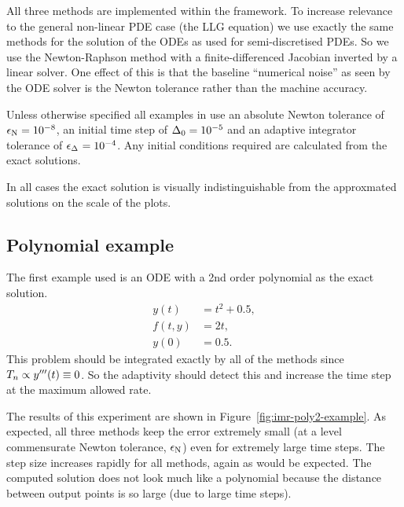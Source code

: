 All three methods are implemented within the \oomph framework.
To increase relevance to the general non-linear PDE case (\ie the LLG equation) we use exactly the same methods for the solution of the ODEs as used for semi-discretised PDEs.
So we use the Newton-Raphson method with a finite-differenced Jacobian inverted by a linear solver.
One effect of this is that the baseline ``numerical noise'' as seen by the ODE solver is the Newton tolerance rather than the machine accuracy.

Unless otherwise specified all examples in  use an absolute Newton tolerance of $\epsilon_{\mathrm{N}} = 10^{-8}$, an initial time step of $\Delta_{0} = 10^{-5}$ and an adaptive integrator tolerance of $\epsilon_{\Delta_{}} = 10^{-4}$.
Any initial conditions required are calculated from the exact solutions.

In all cases the exact solution is visually indistinguishable from the approxmated solutions on the scale of the plots.


\subsection{Polynomial example}
\label{sec:imr-polynomial-example}

The first example used is an ODE with a 2nd order polynomial as the exact solution.
\begin{equation}
  \label{eqn:imr-test-poly2}
  \begin{aligned}
    y(t) &= t^2 + 0.5, \\
    f(t,y) &= 2t, \\
    y(0) & = 0.5.
  \end{aligned}
\end{equation}
This problem should be integrated exactly by all of the methods since $T_n \propto y'''(t) \equiv 0$.
So the adaptivity should detect this and increase the time step at the maximum allowed rate.

The results of this experiment are shown in Figure~\ref{fig:imr-poly2-example}.
As expected, all three methods keep the error extremely small (at a level commensurate Newton tolerance, $\epsilon_{\mathrm{N}}$) even for extremely large time steps.
The step size increases rapidly for all methods, again as would be expected.
The computed solution does not look much like a polynomial because the distance between output points is so large (due to large time steps).

